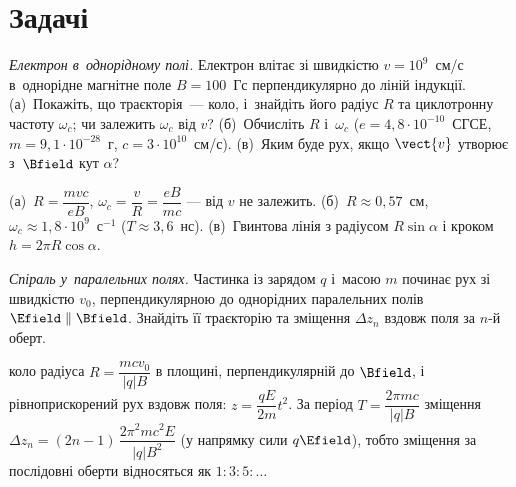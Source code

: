 \section*{Задачі}


{}


\begin{problem}\label{prb:ElectronInField}
	\emph{Електрон в~однорідному полі.} Електрон влітає зі швидкістю $v=10^{9}$~см/с в~однорідне магнітне поле $B=100$~Гс перпендикулярно до ліній індукції. (а)~Покажіть, що траєкторія~--- коло, і~знайдіть його радіус $R$ та циклотронну частоту $\omega_c$; чи залежить $\omega_c$ від $v$? (б)~Обчисліть $R$ і~$\omega_c$ ($e=4{,}8\cdot10^{-10}$~СГСЕ, $m=9{,}1\cdot10^{-28}$~г, $c=3\cdot10^{10}$~см/с). (в)~Яким буде рух, якщо $\vect{v}$ утворює з~$\Bfield$ кут $\alpha$?
	\begin{solution}
		(а)~$R=\dfrac{mvc}{eB}$, $\omega_c=\dfrac{v}{R}=\dfrac{eB}{mc}$ --- від $v$ не залежить. (б)~$R\approx0{,}57$~см, $\omega_c\approx1{,}8\cdot10^{9}$~с$^{-1}$ ($T\approx3{,}6$~нс). (в)~Гвинтова лінія з радіусом $R\sin\alpha$ і кроком $h=2\pi R\cos\alpha$.
	\end{solution}
\end{problem}

\begin{problem}\label{prb:HelixEB}
	\emph{Спіраль у~паралельних полях.} Частинка із зарядом $q$ і~масою $m$ починає рух зі швидкістю $v_0$, перпендикулярною до однорідних паралельних полів $\Efield \parallel \Bfield$. Знайдіть її траєкторію та зміщення $\Delta z_n$ вздовж поля за $n$-й оберт.
	\begin{solution}
		коло радіуса $R = \dfrac{mcv_0}{|q|B}$ в площині, перпендикулярній до $\Bfield$, і рівноприскорений рух вздовж поля: $z = \dfrac{qE}{2m}t^2$. За період $T = \dfrac{2\pi mc}{|q|B}$ зміщення $\Delta z_n = (2n-1)\,\dfrac{2\pi^2 mc^2E}{|q|B^2}$ (у напрямку сили $q\Efield$), тобто зміщення за послідовні оберти відносяться як $1:3:5:\dots$
	\end{solution}
\end{problem}

